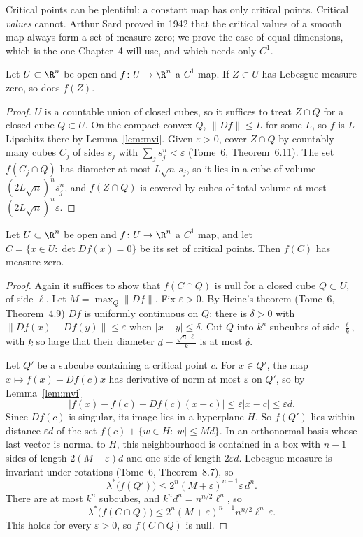 Critical points can be plentiful: a constant map has only critical points. Critical \emph{values} cannot. Arthur Sard proved in 1942 that the critical
values of a smooth map always form a set of measure zero; we prove the case of equal dimensions, which is the one Chapter~4 will use, and which needs
only $C^1$.

\begin{lemma}\label{lem:nullsets}
Let $U\subset\R^n$ be open and $f\colon U\to\R^n$ a $C^1$ map. If $Z\subset U$ has Lebesgue measure zero, so does $f(Z)$.
\end{lemma}
\begin{proof}
$U$ is a countable union of closed cubes, so it suffices to treat $Z\cap Q$ for a closed cube $Q\subset U$. On the compact convex $Q$, $\|Df\|\le L$ for
some $L$, so $f$ is $L$-Lipschitz there by Lemma~\ref{lem:mvi}. Given $\varepsilon>0$, cover $Z\cap Q$ by countably many cubes $C_j$ of sides $s_j$ with
$\sum_js_j^n<\varepsilon$ (Tome~6, Theorem~6.11). The set $f(C_j\cap Q)$ has diameter at most $L\sqrt n\,s_j$, so it lies in a cube of volume
$(2L\sqrt n)^ns_j^n$, and $f(Z\cap Q)$ is covered by cubes of total volume at most $(2L\sqrt n)^n\varepsilon$.
\end{proof}

\begin{theorem}\label{thm:sard}
Let $U\subset\R^n$ be open and $f\colon U\to\R^n$ a $C^1$ map, and let $C=\{x\in U:\det Df(x)=0\}$ be its set of critical points. Then $f(C)$ has
measure zero.
\end{theorem}
\begin{proof}
Again it suffices to show that $f(C\cap Q)$ is null for a closed cube $Q\subset U$, of side $\ell$. Let $M=\max_Q\|Df\|$. Fix $\varepsilon>0$. By Heine's
theorem (Tome~6, Theorem~4.9) $Df$ is uniformly continuous on $Q$: there is $\delta>0$ with $\|Df(x)-Df(y)\|\le\varepsilon$ when $|x-y|\le\delta$. Cut
$Q$ into $k^n$ subcubes of side $\frac\ell k$, with $k$ so large that their diameter $d=\frac{\sqrt n\,\ell}k$ is at most $\delta$.

Let $Q'$ be a subcube containing a critical point $c$. For $x\in Q'$, the map $x\mapsto f(x)-Df(c)x$ has derivative of norm at most $\varepsilon$ on
$Q'$, so by Lemma~\ref{lem:mvi}
\[
\bigl|f(x)-f(c)-Df(c)(x-c)\bigr|\le\varepsilon|x-c|\le\varepsilon d.
\]
Since $Df(c)$ is singular, its image lies in a hyperplane $H$. So $f(Q')$ lies within distance $\varepsilon d$ of the set $f(c)+\{w\in H:|w|\le Md\}$. In an
orthonormal basis whose last vector is normal to $H$, this neighbourhood is contained in a box with $n-1$ sides of length $2(M+\varepsilon)d$ and one side
of length $2\varepsilon d$. Lebesgue measure is invariant under rotations (Tome~6, Theorem~8.7), so
\[
\lambda^*\bigl(f(Q')\bigr)\le2^n(M+\varepsilon)^{n-1}\varepsilon\,d^n.
\]
There are at most $k^n$ subcubes, and $k^nd^n=n^{n/2}\ell^n$, so
\[
\lambda^*\bigl(f(C\cap Q)\bigr)\le2^n(M+\varepsilon)^{n-1}n^{n/2}\ell^n\,\varepsilon.
\]
This holds for every $\varepsilon>0$, so $f(C\cap Q)$ is null.
\end{proof}

